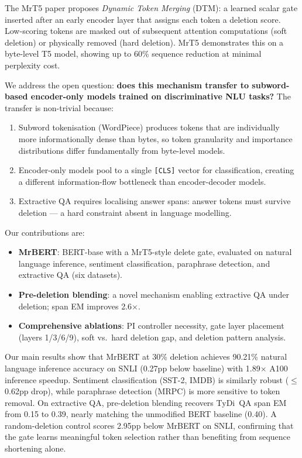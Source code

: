 \documentclass{article} %
\begin{document}
The MrT5 paper \citep{kallini2024mrt5} proposes \emph{Dynamic Token Merging} (DTM): a learned scalar gate inserted after an early encoder layer that assigns each token a deletion score. Low-scoring tokens are masked out of subsequent attention computations (soft deletion) or physically removed (hard deletion). MrT5 demonstrates this on a byte-level T5 model, showing up to 60\% sequence reduction at minimal perplexity cost.

We address the open question: \textbf{does this mechanism transfer to subword-based encoder-only models trained on discriminative NLU tasks?} The transfer is non-trivial because:

\begin{enumerate}[nosep]
    \item Subword tokenisation (WordPiece) produces tokens that are individually more informationally dense than bytes, so token granularity and importance distributions differ fundamentally from byte-level models.
    \item Encoder-only models pool to a single \texttt{[CLS]} vector for classification, creating a different information-flow bottleneck than encoder-decoder models.
    \item Extractive QA requires localising answer spans: answer tokens must survive deletion --- a hard constraint absent in language modelling.
\end{enumerate}


\noindent Our contributions are:
\begin{itemize}[nosep]
    \item \textbf{MrBERT}: BERT-base with a MrT5-style delete gate, evaluated on natural language inference, sentiment classification, paraphrase detection, and extractive QA (six datasets).
    \item \textbf{Pre-deletion blending}: a novel mechanism enabling extractive QA under deletion; span EM improves 2.6$\times$.
    \item \textbf{Comprehensive ablations}: PI controller necessity, gate layer placement (layers 1/3/6/9), soft vs.\ hard deletion gap, and deletion pattern analysis.
\end{itemize}

\noindent Our main results show that MrBERT at 30\% deletion achieves 90.21\% natural language inference accuracy on SNLI (0.27pp below baseline) with 1.89$\times$ A100 inference speedup. Sentiment classification (SST-2, IMDB) is similarly robust ($\leq$0.62pp drop), while paraphrase detection (MRPC) is more sensitive to token removal. On extractive QA, pre-deletion blending recovers TyDi~QA span EM from 0.15 to 0.39, nearly matching the unmodified BERT baseline (0.40). A random-deletion control scores 2.95pp below MrBERT on SNLI, confirming that the gate learns meaningful token selection rather than benefiting from sequence shortening alone.
\end{document}
